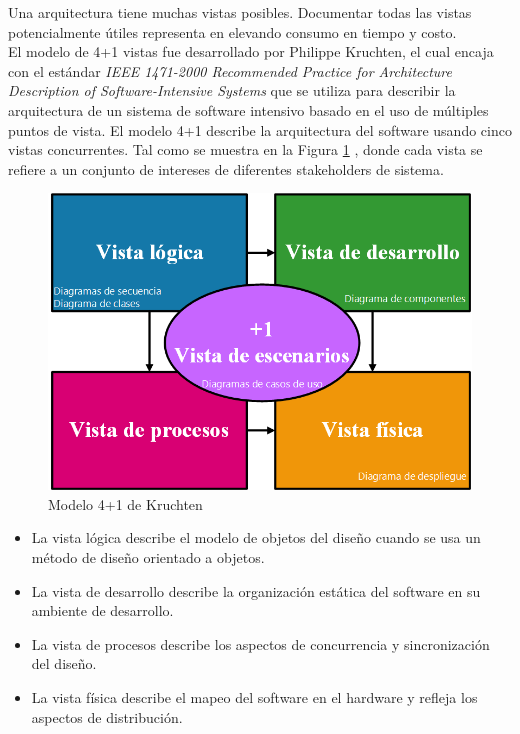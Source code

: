 Una arquitectura tiene muchas vistas posibles. Documentar todas las vistas potencialmente útiles representa en elevando consumo en tiempo y costo.\\

El modelo de 4+1 \cite{Kruchten} vistas fue desarrollado por Philippe Kruchten, el cual encaja con el estándar \textit{IEEE 1471-2000 Recommended Practice for Architecture Description of Software-Intensive Systems} \cite{IEEE1471} que se utiliza para describir la arquitectura de un sistema de software intensivo basado en el uso de múltiples puntos de vista. El modelo 4+1 describe la arquitectura del software usando cinco vistas concurrentes. Tal como se muestra en la Figura \ref{fig:Modelo} , donde cada vista se refiere a un conjunto de intereses de diferentes stakeholders de sistema.

\begin{figure}[H]
	\begin{center}
		\includegraphics[scale=0.5]{./Figuras/Arquitectura/4+1Kruchten}
	\end{center}
	\caption{Modelo 4+1 de Kruchten}
	\label{fig:Modelo}
\end{figure}

\begin{itemize}
	\item La vista lógica describe el modelo de objetos del diseño cuando se usa un método de diseño orientado a objetos. 
	\item La vista de desarrollo describe la organización estática del software en su ambiente de desarrollo.
	\item La vista de procesos describe los aspectos de concurrencia y sincronización del diseño.
	\item La vista física describe el mapeo del software en el hardware y refleja los aspectos de distribución.
\end{itemize}

